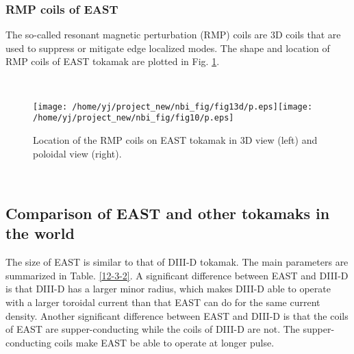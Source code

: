 \documentclass{article}
\begin{document}
\subsubsection{RMP coils of EAST}

The so-called resonant magnetic perturbation (RMP) coils are 3D coils that are
used to suppress or mitigate edge localized modes. The shape and location of
RMP coils of EAST tokamak are plotted in Fig. \ref{19-5-4-p2}.

\

\begin{figure}[h]
  \texttt{[image: /home/yj/project\_new/nbi\_fig/fig13d/p.eps]}\texttt{[image: /home/yj/project\_new/nbi\_fig/fig10/p.eps]}
  \caption{\label{19-5-4-p2}Location of the RMP coils on EAST tokamak in 3D
  view (left) and poloidal view (right).}
\end{figure}

\

\subsection{Comparison of EAST and other tokamaks in the world}

The size of EAST is similar to that of DIII-D tokamak. The main parameters are
summarized in Table. \ref{12-3-2}. A significant difference between EAST and
DIII-D is that DIII-D has a larger minor radius, which makes DIII-D able to
operate with a larger toroidal current than that EAST can do for the same
current density. Another significant difference between EAST and DIII-D is
that the coils of EAST are supper-conducting while the coils of DIII-D are
not. The supper-conducting coils make EAST be able to operate at longer pulse.
\end{document}

